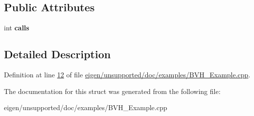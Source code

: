 \subsection*{Public Attributes}
\begin{DoxyCompactItemize}
\item 
\mbox{\label{struct_point_point_minimizer_aef21d5f7e79fc200a6fc8555ec691f7e}} 
int {\bfseries calls}
\end{DoxyCompactItemize}


\subsection{Detailed Description}


Definition at line \hyperlink{eigen_2unsupported_2doc_2examples_2_b_v_h___example_8cpp_source_l00012}{12} of file \hyperlink{eigen_2unsupported_2doc_2examples_2_b_v_h___example_8cpp_source}{eigen/unsupported/doc/examples/\+B\+V\+H\+\_\+\+Example.\+cpp}.



The documentation for this struct was generated from the following file\+:\begin{DoxyCompactItemize}
\item 
eigen/unsupported/doc/examples/\+B\+V\+H\+\_\+\+Example.\+cpp\end{DoxyCompactItemize}
